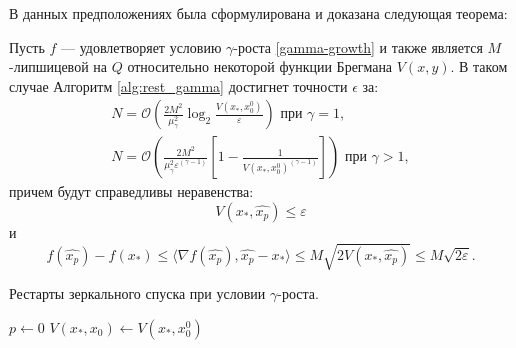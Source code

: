     В данных предположениях была сформулирована и доказана следующая теорема:
    \begin{theorem} \label{simple_restart}
        Пусть $f$ --- удовлетворяет условию $\gamma$-роста \eqref{gamma-growth} и также является $M$-липшицевой на $Q$ относительно некоторой функции Брегмана $V(x, y)$. В таком случае Алгоритм \ref{alg:rest_gamma} достигнет точности $\epsilon$ за:
        \begin{equation}
        \begin{aligned}
           N =\mathcal{O}\left(\frac{2 M^2}{\mu_{\gamma}^2} \log_2{\frac{V(x_*, x_0^0)}{\varepsilon}}\right) \text{ при } \gamma = 1, \\
           N = \mathcal{O}\left(\frac{2 M^2}{\mu_{\gamma}^2 \varepsilon^{(\gamma-1)} } \left[1 - \frac{1} {V(x_*, x_0^0)^{(\gamma - 1)}}\right]\right) \text{ при } \gamma > 1,
        \end{aligned}
        \end{equation}
        причем будут справедливы неравенства:
        \begin{equation}
           V(x_*, \widehat{x_p}) \leq \varepsilon
        \end{equation}
        и
        \begin{equation}
            f(\widehat{x_p}) - f(x_*) \leq  \langle \nabla f(\widehat{x_p}), \widehat{x_p} - x_* \rangle \leq M \sqrt{ 2 V(x_*, \widehat{x_p})} \leq M \sqrt{2 \varepsilon}.  
        \end{equation}
    \end{theorem}

    \begin{algorithm}[htp]
        \caption{Рестарты зеркального спуска при условии $\gamma$-роста.}
        \label{alg:rest_gamma}
        $p \gets 0$\;
        $V(x_*, x_0) \gets V(x_*,x_0^0)$\;
    \end{algorithm}

